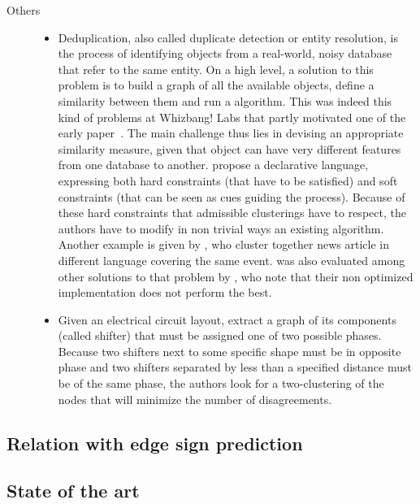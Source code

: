 \begin{description}
   \item[Others]
      \begin{itemize}[leftmargin=*]
	 \item
	    Deduplication, also called duplicate detection or entity resolution, is the process
	    of identifying objects from a real-world, noisy database that refer to the same entity.
	    On a high level, a solution to this problem is to build a graph of all the available
	    objects, define a similarity between them and run a \pcc{} algorithm. This was indeed
	    this kind of problems at Whizbang! Labs that partly motivated one of the early \pcc{}
	    paper~\autocite{Bansal2002}. The main challenge
	    thus lies in devising an appropriate similarity measure, given that object can have very
	    different features from one database to another. \Textcite{LargeScaleDeDup09} propose a
	    declarative language, expressing both hard constraints (that have to be satisfied) and
	    soft constraints (that can be seen as cues guiding the process). Because of these hard
	    constraints that admissible clusterings have to respect, the authors have to modify in
	    non trivial ways an existing \pcc{} algorithm. Another example is given by
	    \textcite{Crosslingual07}, who cluster together news article in different language
	    covering the same event. \pcc{} was also evaluated among other
	    solutions to that problem by \textcite{DeDup09}, who note that their non optimized
	    implementation does not perform the best.
	 \item 
	    Given an electrical circuit layout, \textcite{circuitDesign07} extract a graph of its
	    components (called shifter) that must be assigned one of two possible phases. Because
	    two shifters next to some specific shape must be in opposite phase and two shifters
	    separated by less than a specified distance must be of the same phase, the authors look
	    for a two-clustering of the nodes that will minimize the number of disagreements.
      \end{itemize}
\end{description}

\subsection{Relation with edge sign prediction}
\label{sub:relation_with_edge_sign_prediction}



\subsection{State of the art}
\label{sub:state_of_the_art}

